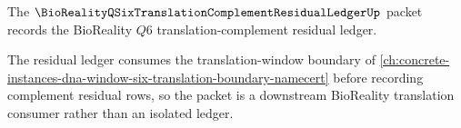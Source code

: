 \label{ch:concrete-instances-bioreality-q-six-translation-complement-residual-ledger-namecert}

The $\BioRealityQSixTranslationComplementResidualLedgerUp$ packet records the BioReality $Q6$ translation-complement residual ledger.

The residual ledger consumes the translation-window boundary of \autoref{ch:concrete-instances-dna-window-six-translation-boundary-namecert} before recording complement residual rows, so the packet is a downstream BioReality translation consumer rather than an isolated ledger.
